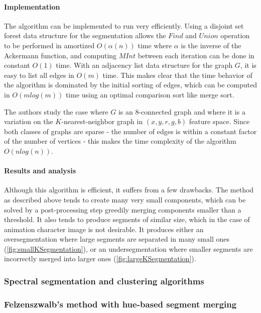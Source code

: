 \paragraph{Implementation} The algorithm can be implemented to run very efficiently. Using a disjoint set forest data structure for the segmentation allows the $Find$ and $Union$ operation to be performed in amortized $O(\alpha(n))$ time where $\alpha$ is the inverse of the Ackermann function, and computing $MInt$ between each iteration can be done in constant $O(1)$ time. With an adjacency list data structure for the graph $G$, it is easy to list all edges in $O(m)$ time. This makes clear that the time behavior of the algorithm is dominated by the initial sorting of edges, which can be computed in $O(mlog(m))$ time using an optimal comparison sort like merge sort.

The authors study the case where $G$ is an $8$-connected graph and where it is a variation on the $K$-nearest-neighbor graph\footnotemark
{}
 in $(x, y, r, g, b)$ feature space. Since both classes of graphs are sparse - the number of edges is within a constant factor of the number of vertices - this makes the time complexity of the algorithm $O(nlog(n))$.

\paragraph{Results and analysis} Although this algorithm is efficient, it suffers from a few drawbacks. The method as described above tends to create many very small components, which can be solved by a post-processing step greedily merging components smaller than a threshold. It also tends to produce segments of similar size, which in the case of animation character image is not desirable. It produces either an oversegmentation where large segments are separated in many small ones (\autoref{fig:smallKSegmentation}), or an undersegmentation where smaller segments are incorrectly merged into larger ones (\autoref{fig:largeKSegmentation}).

\subsubsection{Spectral segmentation and clustering algorithms}

\subsubsection{Felzenszwalb's method with hue-based segment merging}
